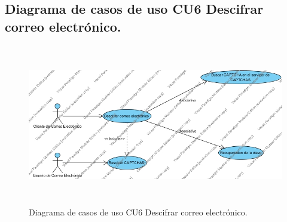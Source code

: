 \subsection{Diagrama de casos de uso CU6 Descifrar correo electrónico.}
\begin{figure}[H]
	\includegraphics[width=1\linewidth, height=7cm]{./images/casodeuso6.jpg}
	\caption{Diagrama de casos de uso CU6 Descifrar correo electrónico.}
	\label{fig:4-7-1}
\end{figure}
\pagebreak
